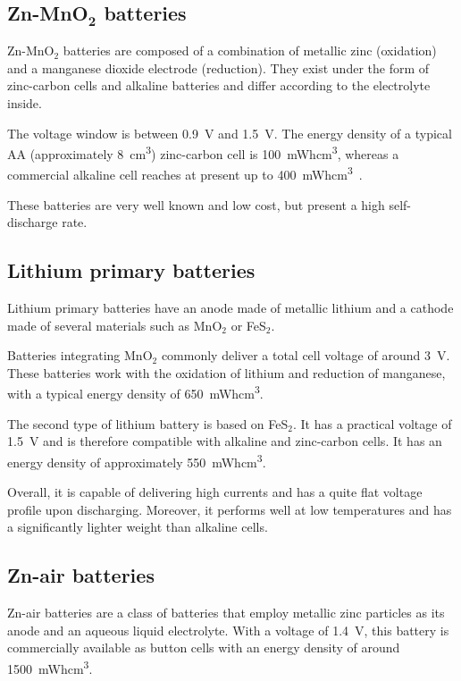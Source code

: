\documentclass{EPL-master-thesis-covers-EN}
\begin{document}
\subsection*{Zn-MnO${}_{\textbf{2}}$ batteries}

Zn-MnO${}_2$ batteries are composed of a combination of metallic zinc (oxidation) and a manganese dioxide electrode (reduction). They exist under the form of zinc-carbon cells and alkaline batteries and differ according to the electrolyte inside.

The voltage window is between \SI{0.9}{V} and \SI{1.5}{V}. The energy density of a typical AA (approximately \SI{8}{cm^3}) zinc-carbon cell is \SI{100}{mWhcm^3}, whereas a commercial alkaline cell reaches at present up to \SI{400}{mWhcm^3}~\cite{doi:10.1002/er.2949}.

These batteries are very well known and low cost, but present a high self-discharge rate.

\subsection*{Lithium primary batteries}

Lithium primary batteries have an anode made of metallic lithium and a cathode made of several materials such as MnO${}_2$ or FeS${}_2$.

Batteries integrating MnO${}_2$ commonly deliver a total cell voltage of around \SI{3}{V}. These batteries work with the oxidation of lithium and reduction of manganese, with a typical energy density of \SI{650}{mWhcm^3}.

The second type of lithium battery is based on FeS${}_2$. It has a practical voltage of \SI{1.5}{V} and is therefore compatible with alkaline and zinc-carbon cells. It has an energy density of approximately \SI{550}{mWhcm^3}.

Overall, it is capable of delivering high currents and has a quite flat voltage profile upon discharging. Moreover, it performs well at low temperatures and has a significantly lighter weight than alkaline cells.

\subsection*{Zn-air batteries}

Zn-air batteries are a class of batteries that employ metallic zinc particles as its anode and an aqueous liquid electrolyte. With a voltage of \SI{1.4}{V}, this
battery is commercially available as button cells with an energy density of around \SI{1500}{mWhcm^3}.
\end{document}
